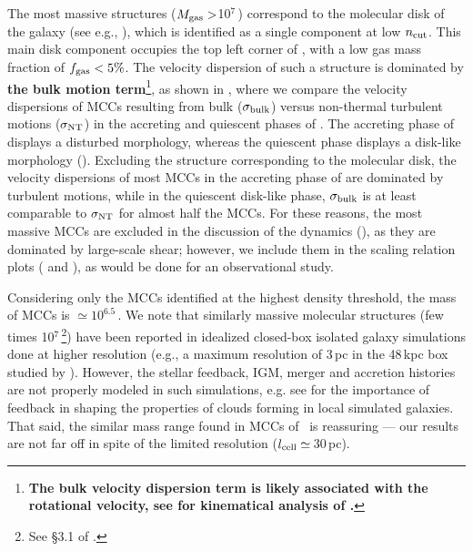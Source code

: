 \IfFileExists{emulateapjlegacy.cls}{\documentclass[iop]{emulateapjlegacy}}{\documentclass[iop]{emulateapj}}
\begin{document}
The most massive structures ($M_{\rm gas}>$10$^7$\,\Msun) correspond to the molecular disk of the galaxy (see e.g., ), which is identified as a single component at low $n_{\rm cut}$. This main disk component occupies the top left corner of , with a low gas mass fraction of $f_{\rm gas}< 5\%$. The velocity dispersion of such a structure is dominated by
{\bf the bulk motion term}\footnote{{\bf The bulk velocity dispersion term is likely associated with the rotational velocity, see \citet{Kohandel19a} for kinematical analysis of \flower.}}, as shown in , where we compare the velocity dispersions of MCCs resulting from bulk ($\sigma_{\rm bulk}$) versus non-thermal turbulent motions ($\sigma_{\rm NT}$) in the accreting and quiescent phases of \flower. The accreting phase of \flower displays a disturbed morphology, whereas the quiescent phase displays a disk-like morphology ().
%
Excluding the structure corresponding to the molecular disk, the velocity dispersions of most MCCs in the accreting phase of \flower are dominated by turbulent motions, while  in the quiescent disk-like phase, $\sigma_{\rm bulk}$ is at least comparable to $\sigma_{\rm NT}$ for almost half the MCCs.
%
For these reasons, the most massive MCCs are excluded in the discussion of the dynamics (), as they are dominated by large-scale shear; however, we include them in the scaling relation plots ( and ), as would be done for an observational study.

Considering only the MCCs identified at the highest density threshold, the mass of MCCs is $\simeq10^{6.5}$\,\Msun. We note that similarly massive molecular structures (few times 10$^7$\,\Msun\footnote{See \S{3.1} of \citet{Behrendt16a}.}) have been reported in idealized closed-box isolated galaxy simulations done at higher resolution (e.g., a maximum resolution of 3\,pc in the 48\,kpc box studied by \citealt{Behrendt16a}). However, the stellar feedback, IGM, merger and accretion histories are not properly modeled in such simulations, e.g. see \citet{grisdale:2017,grisdale:2019} for the importance of feedback in shaping the properties of clouds forming in local simulated galaxies. That said, the similar mass range found in MCCs of \flower\ is reassuring --- our results are not far off in spite of the limited resolution ($l_{\rm cell}\simeq$\,30\,pc).
\end{document}
